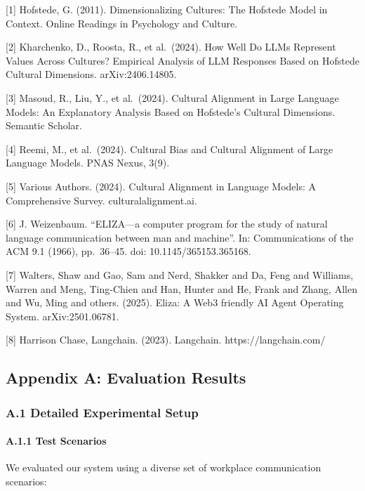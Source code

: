 \documentclass[
]{article}
\begin{document}
{[}1{]} Hofstede, G. (2011). Dimensionalizing Cultures: The Hofstede
Model in Context. Online Readings in Psychology and Culture.

{[}2{]} Kharchenko, D., Roosta, R., et al.~(2024). How Well Do LLMs
Represent Values Across Cultures? Empirical Analysis of LLM Responses
Based on Hofstede Cultural Dimensions. arXiv:2406.14805.

{[}3{]} Masoud, R., Liu, Y., et al.~(2024). Cultural Alignment in Large
Language Models: An Explanatory Analysis Based on Hofstede's Cultural
Dimensions. Semantic Scholar.

{[}4{]} Reemi, M., et al.~(2024). Cultural Bias and Cultural Alignment
of Large Language Models. PNAS Nexus, 3(9).

{[}5{]} Various Authors. (2024). Cultural Alignment in Language Models:
A Comprehensive Survey. culturalalignment.ai.

{[}6{]} J. Weizenbaum. ``ELIZA---a computer program for the study of
natural language communication between man and machine''. In:
Communications of the ACM 9.1 (1966), pp.~36--45. doi:
10.1145/365153.365168.

{[}7{]} Walters, Shaw and Gao, Sam and Nerd, Shakker and Da, Feng and
Williams, Warren and Meng, Ting-Chien and Han, Hunter and He, Frank and
Zhang, Allen and Wu, Ming and others. (2025). Eliza: A Web3 friendly AI
Agent Operating System. arXiv:2501.06781.

{[}8{]} Harrison Chase, Langchain. (2023). Langchain.
https://langchain.com/

\subsection{Appendix A: Evaluation
Results}\label{appendix-a-evaluation-results}

\subsubsection{A.1 Detailed Experimental
Setup}\label{a.1-detailed-experimental-setup}

\paragraph{A.1.1 Test Scenarios}\label{a.1.1-test-scenarios}

We evaluated our system using a diverse set of workplace communication
scenarios:
\end{document}

